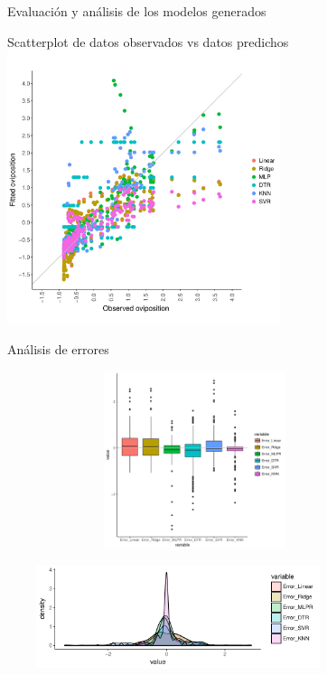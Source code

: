 \documentclass[10pt]{beamer}
\begin{document}
\begin{frame}{Evaluación y análisis de los modelos generados}
  \begin{center}
    Scatterplot de datos observados vs datos predichos
    \includegraphics[width=0.6\textwidth]{scatterplot}
  \end{center}
\end{frame}

\begin{frame}
  \begin{center}
    Análisis de errores
  \end{center}
  \begin{center}
    \includegraphics[width=11cm,height=5.2cm]{boxplot_error}
  \end{center}
  \begin{center}
    \includegraphics[width=10cm,height=3cm]{histogram_error}

  \end{center}

\end{frame}
\end{document}

